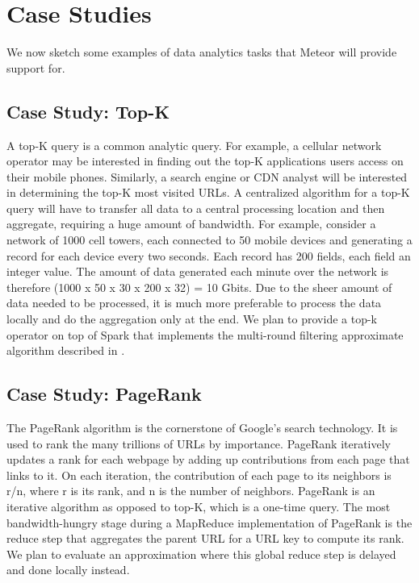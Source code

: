 \section{Case Studies}

We now sketch some examples of data analytics tasks that Meteor will provide support for. 

\subsection{Case Study: Top-K}

A top-K query is a common analytic query. For example, a cellular network operator may be interested in finding out the top-K applications users access on their mobile phones. Similarly, a search engine or CDN analyst will be interested in determining the top-K most visited URLs. 
A centralized algorithm for a top-K query will have to transfer all data to a central processing location and then aggregate, requiring a huge amount of bandwidth. For example, consider a network of 1000 cell towers, each connected to 50 mobile devices and generating a record for each device every two seconds. Each record has 200 fields, each field an integer value. The amount of data generated each minute over the network is therefore (1000 x 50 x 30 x 200 x 32) = 10 Gbits. Due to the sheer amount of data needed to be processed, it is much more preferable to process the data locally and do the aggregation only at the end. We plan to provide a top-k operator on top of Spark that implements the multi-round filtering approximate algorithm described in \cite{topk}.

\subsection{Case Study: PageRank}

The PageRank algorithm is the cornerstone of Google's search technology. It is used to rank the many trillions of URLs by importance. PageRank iteratively updates a rank for each webpage by adding up contributions from each page that links to it. On each iteration, the contribution of each page to its neighbors is r/n, where r is its rank, and n is the number of neighbors.
PageRank is an iterative algorithm as opposed to top-K, which is a one-time query. The most bandwidth-hungry stage during a MapReduce implementation of PageRank is the reduce step that aggregates the parent URL for a URL key to compute its rank. We plan to evaluate an approximation where this global reduce step is delayed and done locally instead. 

